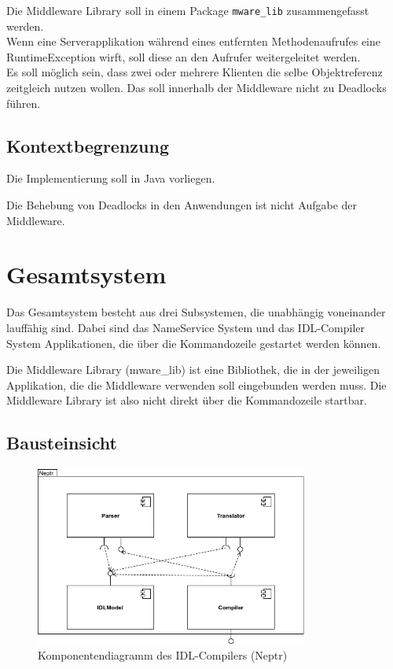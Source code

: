 \documentclass{article}
\begin{document}
Die Middleware Library soll in einem Package \texttt{mware\_lib} zusammengefasst werden.\\

Wenn eine Serverapplikation während eines entfernten Methodenaufrufes eine RuntimeException
wirft, soll diese an den Aufrufer weitergeleitet werden.\\

Es soll möglich sein, dass zwei oder mehrere Klienten die selbe Objektreferenz zeitgleich
nutzen wollen. Das soll innerhalb der Middleware nicht zu Deadlocks führen.

\subsection{Kontextbegrenzung}
Die Implementierung soll in Java vorliegen.

Die Behebung von Deadlocks in den Anwendungen ist nicht Aufgabe der Middleware.

\newpage

\section{Gesamtsystem}
Das Gesamtsystem besteht aus drei Subsystemen, die unabhängig voneinander lauffähig sind.
Dabei sind das NameService System und das IDL-Compiler System Applikationen, die über
die Kommandozeile gestartet werden können.

Die Middleware Library (mware\_lib) ist eine Bibliothek, die in der jeweiligen Applikation,
die die Middleware verwenden soll eingebunden werden muss. Die Middleware Library ist also
nicht direkt über die Kommandozeile startbar.

\subsection{Bausteinsicht}
\begin{figure}[H]
    \centering
    \includegraphics[width=0.8\textwidth]{compiler-components.png}
    \caption[compiler-components]{Komponentendiagramm des IDL-Compilers (Neptr)}
    \label{fig:compiler-component-diagram}
\end{figure}
\end{document}
